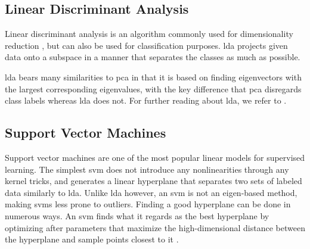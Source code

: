 


\subsection{Linear Discriminant Analysis}

Linear discriminant analysis is an algorithm commonly used for dimensionality reduction \citep{raschka_2014}, but can also be used for classification purposes. \gls{lda} projects given data onto a subspace in a manner that separates the classes as much as possible. 

\gls{lda} bears many similarities to \gls{pca} in that it is based on finding eigenvectors with the largest corresponding eigenvalues, with the key difference that \gls{pca} disregards class labels whereas \gls{lda} does not. For further reading about \gls{lda}, we refer to \citep{raschka_2014}.



\subsection{Support Vector Machines}

Support vector machines are one of the most popular linear models for supervised learning. The simplest \gls{svm} does not introduce any nonlinearities through any kernel tricks, and generates a linear hyperplane that separates two sets of labeled data similarly to \gls{lda}. Unlike \gls{lda} however, an \gls{svm} is not an eigen-based method, making \gls{svm}s less prone to outliers. Finding a good hyperplane can be done in numerous ways. An \gls{svm} finds what it regards as the best hyperplane by optimizing after parameters that maximize the high-dimensional distance between the hyperplane and sample points closest to it \citep{boswell_2002}.


